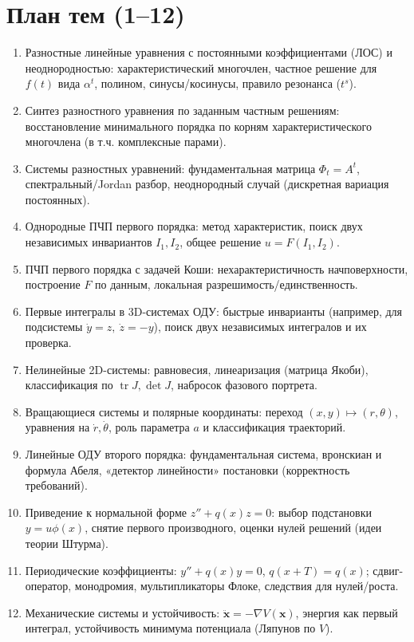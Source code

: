 \documentclass[12pt]{article}
\begin{document}
\section*{План тем (1--12)}

\begin{enumerate}[leftmargin=*,label=\textbf{\arabic*.}]
\item Разностные линейные уравнения с постоянными коэффициентами (ЛОС) и неоднородностью:
      характеристический многочлен, частное решение для $f(t)$ вида $\alpha^t$, полином, синусы/косинусы, правило резонанса ($t^s$).

\item Синтез разностного уравнения по заданным частным решениям:
      восстановление минимального порядка по корням характеристического многочлена (в т.ч. комплексные парами).

\item Системы разностных уравнений:
      фундаментальная матрица $\Phi_t=A^t$, спектральный/Jordan разбор, неоднородный случай (дискретная вариация постоянных).

\item Однородные ПЧП первого порядка:
      метод характеристик, поиск двух независимых инвариантов $I_1,I_2$, общее решение $u=F(I_1,I_2)$.

\item ПЧП первого порядка с задачей Коши:
      нехарактеристичность начповерхности, построение $F$ по данным, локальная разрешимость/единственность.

\item Первые интегралы в 3D-системах ОДУ:
      быстрые инварианты (например, для подсистемы $\dot y=z,\ \dot z=-y$), поиск двух независимых интегралов и их проверка.

\item Нелинейные 2D-системы:
      равновесия, линеаризация (матрица Якоби), классификация по $\operatorname{tr}J,\det J$, набросок фазового портрета.

\item Вращающиеся системы и полярные координаты:
      переход $(x,y)\mapsto (r,\theta)$, уравнения на $\dot r,\dot\theta$, роль параметра $a$ и классификация траекторий.

\item Линейные ОДУ второго порядка:
      фундаментальная система, вронскиан и формула Абеля, «детектор линейности» постановки (корректность требований).

\item Приведение к нормальной форме $z''+q(x)z=0$:
      выбор подстановки $y=u\phi(x)$, снятие первого производного, оценки нулей решений (идеи теории Штурма).

\item Периодические коэффициенты:
      $y''+q(x)y=0$, $q(x+T)=q(x)$; сдвиг-оператор, монодромия, мультипликаторы Флоке, следствия для нулей/роста.

\item Механические системы и устойчивость:
      $\ddot{\mathbf x}=-\nabla V(\mathbf x)$, энергия как первый интеграл, устойчивость минимума потенциала (Ляпунов по $V$).
\end{enumerate}
\end{document}
